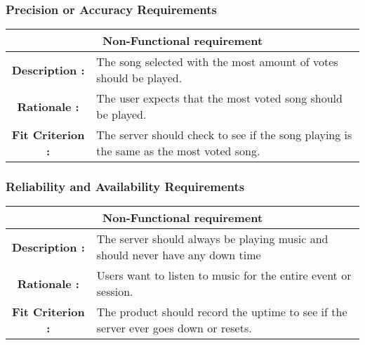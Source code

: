 \documentclass[12pt, titlepage]{article}
\begin{document}
\subsubsection{Precision or Accuracy Requirements}

\begin{center}
\begin{table}[H]
\begin{tabularx}{\textwidth}{| c X |}
\hline
\multicolumn{2}{|c|}{\textbf{Non-Functional requirement}}\\
\hline
\textbf{Description : } &The song selected with the most amount of votes should be played.\\
\hline
\textbf{Rationale : } & The user expects that the most voted song should be played.\\
\hline
\textbf{Fit Criterion : } & The server should check to see if the song playing is the same as the most voted song.\\
\hline
\end{tabularx}
\end{table}
\end{center}


\subsubsection{Reliability and Availability Requirements}
\begin{center}
\begin{table}[H]
\begin{tabularx}{\textwidth}{| c X |}
\hline
\multicolumn{2}{|c|}{\textbf{Non-Functional requirement}}\\
\hline
\textbf{Description : } &  The server should always be playing music and should never have any down time \\ 
\hline 
\textbf{Rationale : } & Users want to listen to music for the entire event or session. \\
\hline
\textbf{Fit Criterion : } & The product should record the uptime to see if the server ever goes down or resets. \\
\hline
\end{tabularx}
\end{table}
\end{center}
\end{document}
